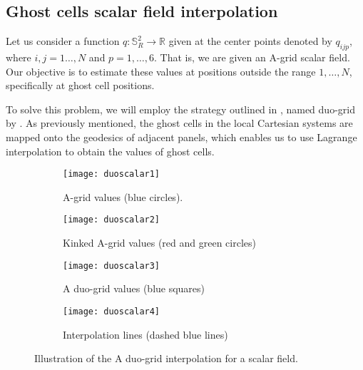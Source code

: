 \subsection{Ghost cells scalar field interpolation}
\label{cs-interp}
Let us consider a function $q: \mathbb{S}^2_R \to \mathbb{R}$ given at the center points
denoted by $q_{ijp}$, where $i, j=1\ldots, N$ and $p=1,\ldots, 6$. That is, we are given an A-grid scalar field.
Our objective is to estimate these values at positions outside the range $1, \ldots, N$, specifically at ghost cell positions.

To solve this problem, we will employ the strategy outlined in \citet{zerroukat:2022}, 
named duo-grid by \citet{chen:2021}.
As previously mentioned, the ghost cells in the local Cartesian systems are mapped onto the geodesics 
of adjacent panels, which enables us to use Lagrange interpolation to obtain the values of ghost cells.
\begin{figure}[!htb]
	\centering
	\begin{subfigure}{0.45\textwidth}
		\centering
		\texttt{[image: duoscalar1]}
		\caption{A-grid values (blue circles).\label{cs-duoscalar-1}}
	\end{subfigure}
	\begin{subfigure}{0.45\textwidth}
		\centering
		\texttt{[image: duoscalar2]}
		\caption{Kinked A-grid values (red and green circles)\label{cs-duoscalar-2}}
	\end{subfigure}

	\begin{subfigure}{0.45\textwidth}
		\centering
		\texttt{[image: duoscalar3]}
		\caption{A duo-grid values (blue squares)\label{cs-duoscalar-3}}
	\end{subfigure}
	\begin{subfigure}{0.45\textwidth}
	\centering
	\texttt{[image: duoscalar4]}
	\caption{Interpolation lines (dashed blue lines)\label{cs-duoscalar-4}}
    \end{subfigure}
 	\caption{Illustration of the A duo-grid interpolation for a scalar field. \label{cs-duoscalar}}
\end{figure}

